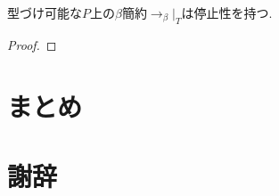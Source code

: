 \documentclass[12pt]{ltjsarticle}
\begin{document}
\begin{thm}
 型づけ可能な$P$上の$\beta$簡約$\rightarrow_{\beta}|_T$は停止性を持つ.
\end{thm}
\begin{proof}
\end{proof}


\section{まとめ}

\section{謝辞}



\end{document}
